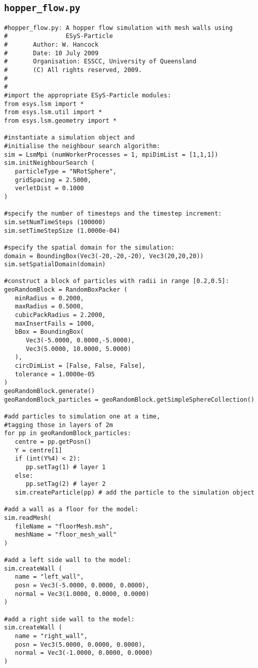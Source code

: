 \subsection{\texttt{hopper\_flow.py}}\label{code:hopper_flow}
\begin{verbatim}
#hopper_flow.py: A hopper flow simulation with mesh walls using
#                ESyS-Particle
#       Author: W. Hancock
#       Date: 10 July 2009
#       Organisation: ESSCC, University of Queensland
#       (C) All rights reserved, 2009.
#
#
#import the appropriate ESyS-Particle modules:
from esys.lsm import *
from esys.lsm.util import *
from esys.lsm.geometry import *

#instantiate a simulation object and
#initialise the neighbour search algorithm:
sim = LsmMpi (numWorkerProcesses = 1, mpiDimList = [1,1,1])
sim.initNeighbourSearch (
   particleType = "NRotSphere",
   gridSpacing = 2.5000,
   verletDist = 0.1000
)

#specify the number of timesteps and the timestep increment:
sim.setNumTimeSteps (100000)
sim.setTimeStepSize (1.0000e-04)

#specify the spatial domain for the simulation:
domain = BoundingBox(Vec3(-20,-20,-20), Vec3(20,20,20))
sim.setSpatialDomain(domain)

#construct a block of particles with radii in range [0.2,0.5]:
geoRandomBlock = RandomBoxPacker (
   minRadius = 0.2000,
   maxRadius = 0.5000,
   cubicPackRadius = 2.2000,
   maxInsertFails = 1000,
   bBox = BoundingBox(
      Vec3(-5.0000, 0.0000,-5.0000),
      Vec3(5.0000, 10.0000, 5.0000)
   ),
   circDimList = [False, False, False],
   tolerance = 1.0000e-05
)
geoRandomBlock.generate()
geoRandomBlock_particles = geoRandomBlock.getSimpleSphereCollection()

#add particles to simulation one at a time,
#tagging those in layers of 2m
for pp in geoRandomBlock_particles:
   centre = pp.getPosn()
   Y = centre[1]
   if (int(Y%4) < 2):
      pp.setTag(1) # layer 1
   else:
      pp.setTag(2) # layer 2
   sim.createParticle(pp) # add the particle to the simulation object

#add a wall as a floor for the model:
sim.readMesh(
   fileName = "floorMesh.msh",
   meshName = "floor_mesh_wall"
)

#add a left side wall to the model:
sim.createWall (
   name = "left_wall",
   posn = Vec3(-5.0000, 0.0000, 0.0000),
   normal = Vec3(1.0000, 0.0000, 0.0000)
)

#add a right side wall to the model:
sim.createWall (
   name = "right_wall",
   posn = Vec3(5.0000, 0.0000, 0.0000),
   normal = Vec3(-1.0000, 0.0000, 0.0000)
)


\end{verbatim}
